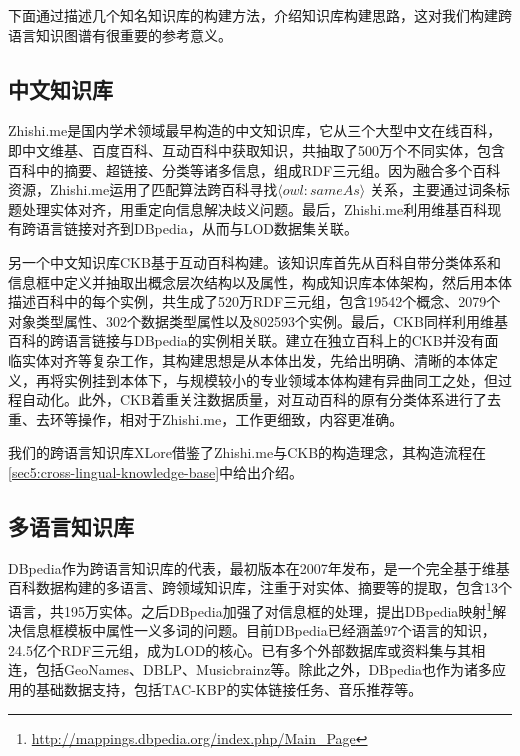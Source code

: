 下面通过描述几个知名知识库的构建方法，介绍知识库构建思路，这对我们构建跨语言知识图谱有很重要的参考意义。

\subsection{中文知识库}

Zhishi.me\cite{niu2011zhishi,wang2014publishing}是国内学术领域最早构造的中文知识库，它从三个大型中文在线百科，即中文维基、百度百科、互动百科中获取知识，共抽取了500万个不同实体，包含百科中的摘要、超链接、分类等诸多信息，组成RDF三元组。因为融合多个百科资源，Zhishi.me运用了匹配算法跨百科寻找$\langle owl:sameAs\rangle$ 关系，主要通过词条标题处理实体对齐，用重定向信息解决歧义问题。最后，Zhishi.me利用维基百科现有跨语言链接对齐到DBpedia，从而与LOD数据集关联。

另一个中文知识库CKB\cite{wang2011building}基于互动百科构建。该知识库首先从百科自带分类体系和信息框中定义并抽取出概念层次结构以及属性，构成知识库本体架构，然后用本体描述百科中的每个实例，共生成了520万RDF三元组，包含19542个概念、2079个对象类型属性、302个数据类型属性以及802593个实例。最后，CKB同样利用维基百科的跨语言链接与DBpedia的实例相关联。建立在独立百科上的CKB并没有面临实体对齐等复杂工作，其构建思想是从本体出发，先给出明确、清晰的本体定义，再将实例挂到本体下，与规模较小的专业领域本体构建有异曲同工之处，但过程自动化。此外，CKB着重关注数据质量，对互动百科的原有分类体系进行了去重、去环等操作，相对于Zhishi.me，工作更细致，内容更准确。

我们的跨语言知识库XLore借鉴了Zhishi.me与CKB的构造理念，其构造流程在\ref{sec5:cross-lingual-knowledge-base}中给出介绍。

\subsection{多语言知识库}
DBpedia作为跨语言知识库的代表，最初版本在2007年发布\cite{auer2007dbpedia}，是一个完全基于维基百科数据构建的多语言、跨领域知识库，注重于对实体、摘要等的提取，包含13个语言，共195万实体。之后DBpedia加强了对信息框的处理，提出DBpedia映射\footnote{\url{http://mappings.dbpedia.org/index.php/Main_Page}}解决信息框模板中属性一义多词的问题。目前DBpedia已经涵盖97个语言的知识，24.5亿个RDF三元组，成为LOD的核心。已有多个外部数据库或资料集与其相连，包括GeoNames、DBLP、Musicbrainz等。除此之外，DBpedia也作为诸多应用的基础数据支持，包括TAC-KBP\cite{mendes2011evaluating}的实体链接任务、音乐推荐\cite{passant2010dbrec}等。


